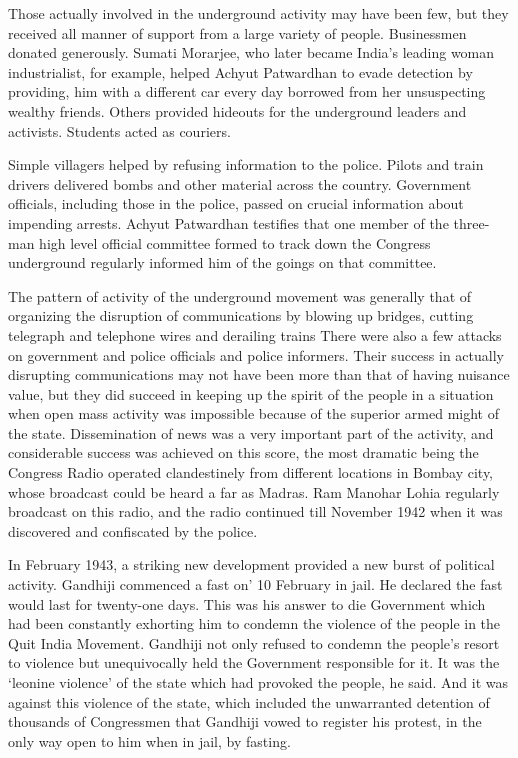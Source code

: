 Those actually involved in the underground activity may have been few, but they received all manner of support from a large variety of people. Businessmen donated generously. Sumati Morarjee, who later became India's leading woman industrialist, for example, helped Achyut Patwardhan to evade detection by providing, him with a different car every day borrowed from her unsuspecting wealthy friends. Others provided hideouts for the underground leaders and activists. Students acted as couriers.

Simple villagers helped by refusing information to the police. Pilots and train drivers delivered bombs and other material across the country. Government officials, including those in the police, passed on crucial information about impending arrests. Achyut Patwardhan testifies that one member of the three-man high level official committee formed to track down the Congress underground regularly informed him of the goings on that committee.

The pattern of activity of the underground movement was generally that of organizing the disruption of communications by blowing up bridges, cutting telegraph and telephone wires and derailing trains There were also a few attacks on government and police officials and police informers. Their success in actually disrupting communications may not have been more than that of having nuisance value, but they did succeed in keeping up the spirit of the people in a situation when open mass activity was impossible because of the superior armed might of the state. Dissemination of news was a very important part of the activity, and considerable success was achieved on this score, the most dramatic being the Congress Radio operated clandestinely from different locations in Bombay city, whose broadcast could be heard a far as Madras. Ram Manohar Lohia regularly broadcast on this radio, and the radio continued till November 1942 when it was discovered and confiscated by the police.

In February 1943, a striking new development provided a new burst of political activity. Gandhiji commenced a fast on' 10 February in jail. He declared the fast would last for twenty-one days. This was his answer to die Government which had been constantly exhorting him to condemn the violence of the people in the Quit India Movement. Gandhiji not only refused to condemn the people's resort to violence but unequivocally held the Government responsible for it. It was the `leonine violence' of the state which had provoked the people, he said. And it was against this violence of the state, which included the unwarranted detention of thousands of Congressmen that Gandhiji vowed to register his protest, in the only way open to him when in jail, by fasting.


